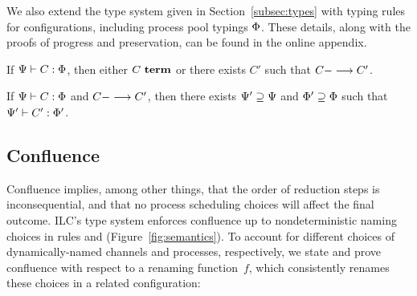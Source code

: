 We also extend the type system given in Section~\ref{subsec:types} with typing
rules for configurations, including process pool typings $\PrTy$. These details,
along with the proofs of progress and preservation, can be found in the online
appendix.
%
%



\begin{theorem}[Progress]
If $\JCty{\StTy}{\ChTy}{C}{\PrTy}$, then either $\JCterm{C}$ or there exists
$C'$ such that $\JCred{C}{C'}$.
\end{theorem}

\begin{theorem}[Preservation]
If $\JCty{\StTy}{\ChTy}{C}{\PrTy}$ and $\JCred{C}{C'}$, then there exists
$\ChTy' \supseteq \ChTy$ and $\PrTy' \supseteq \PrTy$ such that
$\JCty{\StTy'}{\ChTy'}{C'}{\PrTy'}$.
\end{theorem}

\subsection{Confluence}

Confluence implies, among other things, that the order of reduction steps is
inconsequential, and that no process scheduling choices will affect
the final outcome. ILC's type system enforces confluence 
up to nondeterministic naming choices in 
rules  and  (Figure~\ref{fig:semantics}).
%
To account for different choices of dynamically-named channels and processes, respectively, 
we state and prove confluence
with respect to a renaming function~$f$, which consistently renames
these choices in a related configuration:

